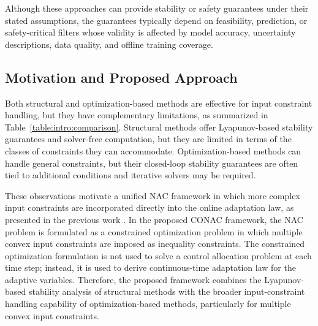\documentclass[letterpaper, journal]{IEEEtran}
\begin{document}
Although these approaches can provide stability or safety guarantees under their stated assumptions, the guarantees typically depend on feasibility, prediction, or safety-critical filters whose validity is affected by model accuracy, uncertainty descriptions, data quality, and offline training coverage.


\subsection{Motivation and Proposed Approach}

Both structural and optimization-based methods are effective for input constraint handling, but they have complementary limitations, as summarized in Table~\ref{table:intro:comparison}.
Structural methods offer Lyapunov-based stability guarantees and solver-free computation, but they are limited in terms of the classes of constraints they can accommodate.
Optimization-based methods can handle general constraints, but their closed-loop stability guarantees are often tied to additional conditions and iterative solvers may be required.

These observations motivate a unified NAC framework in which more complex input constraints are incorporated directly into the online adaptation law, as presented in the previous work \cite{Ryu:2025aa}.
In the proposed CONAC framework, the NAC problem is formulated as a constrained optimization problem in which multiple convex input constraints are imposed as inequality constraints.
The constrained optimization formulation is not used to solve a control allocation problem at each time step; instead, it is used to derive continuous-time adaptation law for the adaptive variables.
Therefore, the proposed framework combines the Lyapunov-based stability analysis of structural methods with the broader input-constraint handling capability of optimization-based methods, particularly for multiple convex input constraints.
\end{document}
